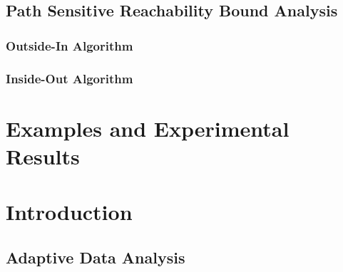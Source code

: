 \documentclass[12pt, letterpaper]{report}   %
\begin{document}
\section{Path Sensitive Reachability Bound Analysis}
\label{sec:reachability-analysis}
\subsection{Outside-In Algorithm}
\label{sec:outsidein}
\subsection{Inside-Out Algorithm}
\label{sec:insideout}



\chapter{Examples and Experimental Results}
\label{sec:reachability-example}



\chapter*{}

\chapter{Introduction}
\label{sec:adapt-intro}

\section{Adaptive Data Analysis}
\label{sec:adapt-background}

\end{document}

